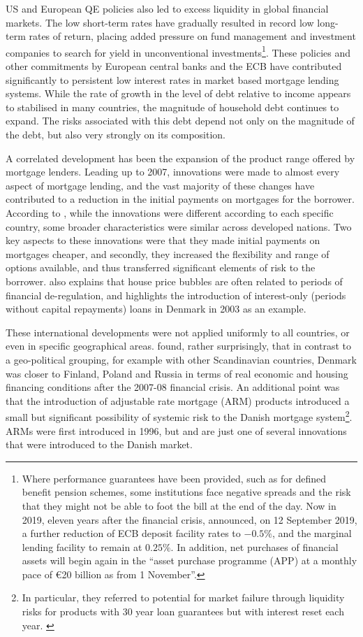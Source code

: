 \documentclass[
]{book}
\begin{document}
US and European QE policies also led to excess liquidity in global financial markets. The low short-term rates have gradually resulted in record low long-term rates of return, placing added pressure on fund management and investment companies to search for yield in unconventional investments\footnote{Where performance guarantees have been provided, such as for defined benefit pension schemes, some institutions face negative spreads and the risk that they might not be able to foot the bill at the end of the day. Now in 2019, eleven years after the financial crisis, \citet{ECB2019} announced, on 12 September 2019, a further reduction of ECB deposit facility rates to \(-0.5\%\), and the marginal lending facility to remain at \(0.25\%\). In addition, net purchases of financial assets will begin again in the ``asset purchase programme (APP) at a monthly pace of €20 billion as from 1 November''.}. These policies and other commitments by European central banks and the ECB have contributed significantly to persistent low interest rates in market based mortgage lending systems. While the rate of growth in the level of debt relative to income appears to stabilised in many countries, the magnitude of household debt continues to expand. The risks associated with this debt depend not only on the magnitude of the debt, but also very strongly on its composition.

A correlated development has been the expansion of the product range offered by mortgage lenders. Leading up to 2007, innovations were made to almost every aspect of mortgage lending, and the vast majority of these changes have contributed to a reduction in the initial payments on mortgages for the borrower. According to \citet{scanlon2008}, while the innovations were different according to each specific country, some broader characteristics were similar across developed nations. Two key aspects to these innovations were that they made initial payments on mortgages cheaper, and secondly, they increased the flexibility and range of options available, and thus transferred significant elements of risk to the borrower. \citet{andre2016household} also explains that house price bubbles are often related to periods of financial de-regulation, and highlights the introduction of interest-only (periods without capital repayments) loans in Denmark in 2003 as an example.

These international developments were not applied uniformly to all countries, or even in specific geographical areas. \citet{lunde2014introduction} found, rather surprisingly, that in contrast to a geo-political grouping, for example with other Scandinavian countries, Denmark was closer to Finland, Poland and Russia in terms of real economic and housing financing conditions after the 2007-08 financial crisis. An additional point was that the introduction of adjustable rate mortgage (ARM) products introduced a small but significant possibility of systemic risk to the Danish mortgage system\footnote{In particular, they referred to potential for market failure through liquidity risks for products with 30 year loan guarantees but with interest reset each year. \citet{lunde2014introduction}}. ARMs were first introduced in 1996, but and are just one of several innovations that were introduced to the Danish market.
\end{document}

